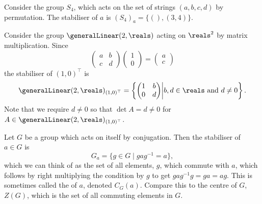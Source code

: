 \documentclass[fleqn]{NotesClass}
\newcommand*{\trans}{\top}
\begin{document}
    \begin{exm}{}{}
        Consider the group \(S_4\), which acts on the set of strings \((a, b, c, d)\) by permutation.
        The stabiliser of \(a\) is \((S_4)_a = \{(), (3, 4)\}\).
        
        Consider the group \(\generalLinear(2, \reals)\) acting on \(\reals^2\) by matrix multiplication.
        Since
        \begin{equation}
            \begin{pmatrix}
                a & b\\
                c & d
            \end{pmatrix}
            \begin{pmatrix}
                1\\ 0
            \end{pmatrix}
            =
            \begin{pmatrix}
                a\\ c
            \end{pmatrix}
        \end{equation}
        the stabiliser of \((1, 0)^\trans\) is
        \begin{equation}
            \generalLinear(2, \reals)_{(1, 0)^\trans} = \left\{ 
                \begin{pmatrix}
                    1 & b\\
                    0 & d
                \end{pmatrix}
            \middle| b, d \in \reals \text{ and } d \ne 0
            \right\}.
        \end{equation}
        Note that we require \(d \ne 0\) so that \(\det A = d \ne 0\) for \(A \in \generalLinear(2, \reals)_{(1, 0)^\trans}\).
        
        Let \(G\) be a group which acts on itself by conjugation.
        Then the stabiliser of \(a \in G\) is
        \begin{equation}
            G_a = \{g \in G \mid gag^{-1} = a \},
        \end{equation}
        which we can think of as the set of all elements, \(g\), which commute with \(a\), which follows by right multiplying the condition by \(g\) to get \(gag^{-1}g = ga = ag\).
        This is sometimes called the  of \(a\), denoted \(C_G(a)\).
        Compare this to the centre of \(G\), \(Z(G)\), which is the set of all commuting elements in \(G\).
    \end{exm}
    
\end{document}
